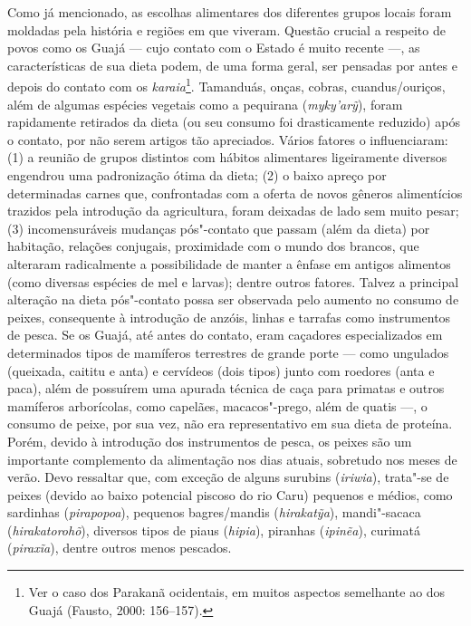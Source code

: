 Como já mencionado, as escolhas alimentares dos diferentes grupos locais
foram moldadas pela história e regiões em que viveram. Questão crucial a
respeito de povos como os Guajá --- cujo contato com o Estado é muito
recente ---, as características de sua dieta podem, de uma forma geral,
ser pensadas por antes e depois do contato com os
\emph{karaia}\footnote{Ver o caso dos Parakanã ocidentais, em muitos
  aspectos semelhante ao dos Guajá (Fausto, 2000: 156--157).}. Tamanduás,
onças, cobras, cuandus/ouriços, além de algumas espécies vegetais como a
pequirana (\emph{myky'arỹ}), foram rapidamente retirados da dieta (ou
seu consumo foi drasticamente reduzido) após o contato, por não serem
artigos tão apreciados. Vários fatores o influenciaram: (1) a reunião de
grupos distintos com hábitos alimentares ligeiramente diversos engendrou
uma padronização ótima da dieta; (2) o baixo apreço por determinadas
carnes que, confrontadas com a oferta de novos gêneros alimentícios
trazidos pela introdução da agricultura, foram deixadas de lado sem
muito pesar; (3) incomensuráveis mudanças pós"-contato que passam (além
da dieta) por habitação, relações conjugais, proximidade com o mundo dos
brancos, que alteraram radicalmente a possibilidade de manter a ênfase
em antigos alimentos (como diversas espécies de mel e larvas); dentre
outros fatores. Talvez a principal alteração na dieta pós"-contato possa
ser observada pelo aumento no consumo de peixes, consequente à
introdução de anzóis, linhas e tarrafas como instrumentos de pesca. Se
os Guajá, até antes do contato, eram caçadores especializados em
determinados tipos de mamíferos terrestres de grande porte --- como
ungulados (queixada, caititu e anta) e cervídeos (dois tipos) junto com
roedores (anta e paca), além de possuírem uma apurada técnica de caça
para primatas e outros mamíferos arborícolas, como capelães,
macacos"-prego, além de quatis ---, o consumo de peixe, por sua vez, não
era representativo em sua dieta de proteína. Porém, devido à introdução
dos instrumentos de pesca, os peixes são um importante complemento da
alimentação nos dias atuais, sobretudo nos meses de verão. Devo
ressaltar que, com exceção de alguns surubins (\emph{iriwia}), trata"-se
de peixes (devido ao baixo potencial piscoso do rio Caru) pequenos e
médios, como sardinhas (\emph{pirapopoa}), pequenos bagres/mandis
(\emph{hirakatỹa}), mandi"-sacaca (\emph{hirakatorohõ}), diversos tipos
de piaus (\emph{hipia}), piranhas (\emph{ipinẽa}), curimatá
(\emph{piraxĩa}), dentre outros menos pescados.

